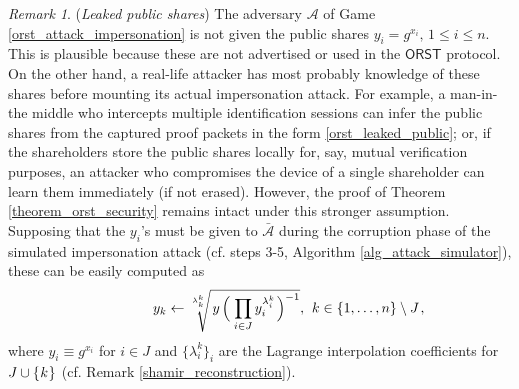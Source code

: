 \documentclass[10pt, psamsfonts, reqno]{amsart}
\theoremstyle{definition}
\theoremstyle{remark}
\newtheorem{rem}[thm]{Remark}
\numberwithin{equation}{section}
\begin{document}
\begin{rem}\label{rem_leaked_public_shares}
(\textit{Leaked public shares})
The adversary $\mathcal{A}$ of Game \ref{orst_attack_impersonation}
is not given the public shares
$y_i = g ^ {x_i},\hspace{2pt} 1 \le i \le n$.
This is plausible because these are not advertised or used
in the $\mathsf{ORST}$ protocol.
On the other hand, a real-life attacker has most probably
knowledge of these shares before mounting
its actual impersonation attack.
For example, a man-in-the middle who intercepts multiple
identification sessions can infer the public shares
from the captured proof packets in the form
\eqref{orst_leaked_public};
or, if the shareholders store the public shares
locally for, say, mutual verification purposes,
an attacker who compromises the device of a single shareholder
can learn them immediately (if not erased).
However, the proof of Theorem \ref{theorem_orst_security}
remains intact under this stronger assumption.
Supposing that the $y_i$'s must be given to $\mathcal{\bar{A}}$
during the corruption phase of the simulated impersonation attack
(cf. steps 3-5, Algorithm \ref{alg_attack_simulator}),
these can be easily computed as
\vspace{5pt}
\begin{equation*}
\hspace{42pt}
y_k \leftarrow
\sqrt[\leftroot{0}\uproot{10}\lambda_k^k]{\hspace{1.5pt}y\hspace{1.5pt}
\Big(\hspace{1pt}\prod_{i \in J} y_i^{\lambda_i^k}\hspace{1pt}\Big)^{-1}},
\hspace{4pt} k \in \{1, \dots, n\} \setminus J\hspace{1pt},
\vspace{5pt}
\end{equation*}
where $y_i \equiv g ^ {x_i}$ for $i \in J$
and $\{\lambda_i^k\}_i$
are the Lagrange interpolation coefficients for
$J \cup \{\hspace{0.5pt}k\hspace{0.5pt}\}$
(cf. Remark \ref{shamir_reconstruction}).
\end{rem}
\end{document}
